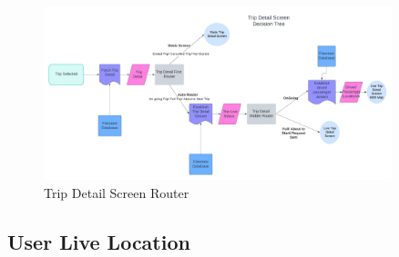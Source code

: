 \documentclass[a4paper, 12pt]{report} %
\begin{document}
            \begin{figure}
                \centering
                \includegraphics[width=0.9\textwidth]{Images/trip_detail_screen_variations.png}
                \caption{Trip Detail Screen Router}
                \label{fig:trip_detail_screen_variations}
            \end{figure}

            \FloatBarrier

        \subsection{User Live Location}
\end{document}
